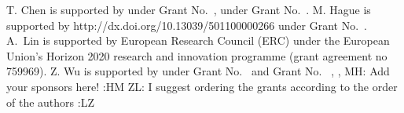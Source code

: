 \documentclass[acmsmall,10pt]{acmart}\settopmatter{}
\newcommand{\zhilin}[1]{\color{brown} {ZL: #1 :LZ} \color{black}}
\newcommand{\mat}[1]{\color{cyan} {MH: #1 :HM} \color{black}}
\newcommand{\zhilin}[1]{}
\newcommand{\mat}[1]{}
\begin{document}
\begin{acks}
T. Chen is supported by  under Grant No.~,  under Grant No.~. 
    M. Hague is supported by 
                 {http://dx.doi.org/10.13039/501100000266}
    under Grant No.~.
    A.~Lin is supported by European Research Council (ERC) under the European
    Union's Horizon 2020 research and innovation programme (grant agreement no
    759969).
    Z. Wu is supported by 
    under Grant No.~ and Grant No. ~,  
    , 
    \mat{Add your sponsors here!}\zhilin{I suggest ordering the grants according to the order of the authors}
\end{acks}


%

\newpage



\newpage


\end{document}
